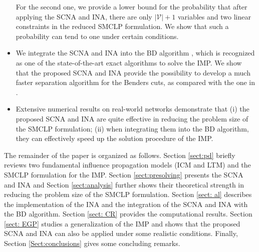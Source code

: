 \documentclass[a4paper,10pt]{article}
\theoremstyle{plain}
\newcommand{\revv}[1]{{#1}}
\begin{document}
\begin{itemize}
		For the second one, we provide a lower bound for the probability that after applying the SCNA and INA, there are only $|\mathcal{V}|+1$ variables and two linear constraints in the reduced SMCLP formulation.
		We show that such a probability can tend to one under certain conditions. 
		\item We integrate the SCNA and INA into the BD algorithm \cite{Guney2020}, which is recognized as one of the state-of-the-art exact algorithms to solve the IMP.
		We show that the proposed SCNA and INA provide the possibility to develop a much faster separation algorithm for the Benders cuts, as compared with the one in \cite{Guney2020}.
		\item Extensive numerical results on real-world \revv{networks} demonstrate that (i) the proposed SCNA and INA are quite effective in reducing the problem size of the SMCLP formulation; 
		(ii) 
		when integrating them into the BD algorithm, they can effectively speed up the solution procedure of the IMP.
	\end{itemize}
	
	
	
	The remainder of the paper is organized as follows. Section \ref{sect:pd} briefly reviews two fundamental influence propagation models (ICM and LTM) and the SMCLP formulation for the IMP.
	Section \ref{sect:presolving} presents the SCNA and INA and \revv{Section} \ref{sect:analysis} further shows their theoretical strength in reducing the problem size of the SMCLP formulation. 
	Section \ref{sect: al} describes the implementation of the \revv{INA} and the integration of \revv{the SCNA and INA} with the BD algorithm.
	Section \ref{sect: CR} provides the computational results.
	Section \ref{sect: EGP} studies a generalization of the IMP and shows that the proposed SCNA and INA can also be applied under some realistic conditions.
	Finally, \revv{Section} \ref{Sect:conclusions} gives some concluding remarks.
	
\end{document}
